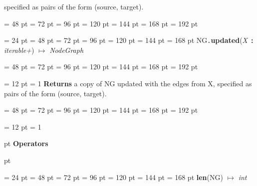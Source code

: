 {{{{specified as pairs of the form (source, target).\par}
{\par \noindent  \leftskip = 48 pt  \leftmargini = 72 pt  \leftmarginii = 96 pt  \leftmarginiii = 120 pt  \leftmarginiv = 144 pt  \leftmarginv = 168 pt  \leftmarginvi = 192 pt {\par \noindent
\par}
\par}
\par}
\par}
{\par \noindent  \leftskip = 24 pt  \leftmargini = 48 pt  \leftmarginii = 72 pt  \leftmarginiii = 96 pt  \leftmarginiv = 120 pt  \leftmarginv = 144 pt  \leftmarginvi = 168 pt NG{\tt .\/}{\bf {\large {\bf updated\/}}\/}({\em X\/}~{\bf :}  {\em iterable+\/}) \(\mapsto \)  {\em NodeGraph\/}{\par \noindent
{\par \noindent  \leftskip = 48 pt  \leftmargini = 72 pt  \leftmarginii = 96 pt  \leftmarginiii = 120 pt  \leftmarginiv = 144 pt  \leftmarginv = 168 pt  \leftmarginvi = 192 pt {\par \noindent
{\par \pagebreak[3.100000] \noindent \hangindent = 12 pt \hangafter = 1 
{\bf Returns \/} a copy of NG updated with the edges from X,
specified as pairs of the form (source, target).\par}
\par}
\par}
{\par \noindent  \leftskip = 48 pt  \leftmargini = 72 pt  \leftmarginii = 96 pt  \leftmarginiii = 120 pt  \leftmarginiv = 144 pt  \leftmarginv = 168 pt  \leftmarginvi = 192 pt {\par \noindent
\par}
\par}
\par}
\par}
{\par \pagebreak[3.300000] \noindent \hangindent = 12 pt \hangafter = 1 
{\par \pagebreak[3]  pt \noindent
{\Large {\bf Operators\/}}\par {} pt
} \noindent
\par}
{\par \noindent  \leftskip = 24 pt  \leftmargini = 48 pt  \leftmarginii = 72 pt  \leftmarginiii = 96 pt  \leftmarginiv = 120 pt  \leftmarginv = 144 pt  \leftmarginvi = 168 pt {\large {\bf len\/}}(NG) \(\mapsto \)  {\em int\/}{\par \noindent
}}}
